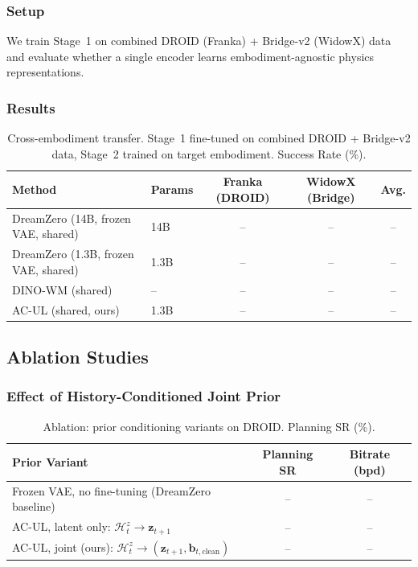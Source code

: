 \documentclass{article}
\newcommand{\vz}{\bm{z}}
\newcommand{\vb}{\bm{b}}
\begin{document}
\subsubsection{Setup}

We train Stage~1 on combined DROID (Franka) + Bridge-v2 (WidowX) data and evaluate whether a single encoder learns embodiment-agnostic physics representations.

\subsubsection{Results}

\begin{table}[t]
\centering
\caption{Cross-embodiment transfer. Stage~1 fine-tuned on combined DROID + Bridge-v2 data, Stage~2 trained on target embodiment. Success Rate (\%).}
\label{tab:cross_embodiment}
\begin{tabular}{llccc}
\toprule
\textbf{Method} & \textbf{Params} & \textbf{Franka (DROID)} & \textbf{WidowX (Bridge)} & \textbf{Avg.} \\
\midrule
DreamZero (14B, frozen VAE, shared)  & 14B  & -- & -- & -- \\
DreamZero (1.3B, frozen VAE, shared) & 1.3B & -- & -- & -- \\
DINO-WM (shared)                     & --   & -- & -- & -- \\
\midrule
AC-UL (shared, ours)                 & 1.3B & -- & -- & -- \\
\bottomrule
\end{tabular}
\end{table}

\subsection{Ablation Studies}
\label{sec:ablations}

\subsubsection{Effect of History-Conditioned Joint Prior}

\begin{table}[t]
\centering
\caption{Ablation: prior conditioning variants on DROID. Planning SR (\%).}
\label{tab:ablation_prior}
\begin{tabular}{lcc}
\toprule
\textbf{Prior Variant} & \textbf{Planning SR} & \textbf{Bitrate (bpd)} \\
\midrule
Frozen VAE, no fine-tuning (DreamZero baseline)   & -- & -- \\
AC-UL, latent only: $\mathcal{H}_t^z \to \vz_{t+1}$ & -- & -- \\
AC-UL, joint (ours): $\mathcal{H}_t^z \to (\vz_{t+1}, \vb_{t,\text{clean}})$ & -- & -- \\
\bottomrule
\end{tabular}
\end{table}
\end{document}

